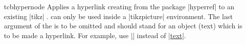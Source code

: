 \begin{docCommand}[doc new=2016-02-03]{tcbhypernode}{}
  Applies a hyperlink creating  from the package |hyperref| \cite{rahtz:2012a}
  to an existing |tikz| .  can only
  be used inside a |tikzpicture| environment.
  The last argument of the  is to be omitted and should stand
  for an object (text) which is to be made a hyperlink.
  For example, use  |\hyperref[name]| instead of |\hyperref[name]{text}|.

\begin{dispExample}
\end{dispExample}

\end{docCommand}

